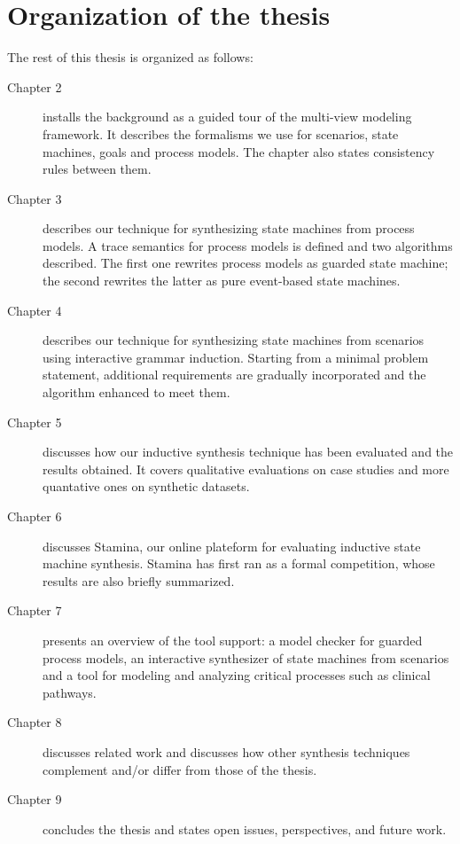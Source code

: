 \section{Organization of the thesis\label{section:intro-organization}}

The rest of this thesis is organized as follows:

\begin{description}

\item[Chapter 2] installs the background as a guided tour of the multi-view modeling framework. It describes the formalisms we use for scenarios, state machines, goals and process models. The chapter also states consistency rules between them.

\item[Chapter 3] describes our technique for synthesizing state machines from process models. A trace semantics for process models is defined and two algorithms described. The first one rewrites process models as guarded state machine; the second rewrites the latter as pure event-based state machines.

\item[Chapter 4] describes our technique for synthesizing state machines from scenarios using interactive grammar induction. Starting from a minimal problem statement, additional requirements are gradually incorporated and the algorithm enhanced to meet them.

\item[Chapter 5] discusses how our inductive synthesis technique has been evaluated and the results obtained. It covers qualitative evaluations on case studies and more quantative ones on synthetic datasets.

\item[Chapter 6] discusses Stamina, our online plateform for evaluating inductive state machine synthesis. Stamina has first ran as a formal competition, whose results are also briefly summarized.

\item[Chapter 7] presents an overview of the tool support: a model checker for guarded process models, an interactive synthesizer of state machines from scenarios and a tool for modeling and analyzing critical processes such as clinical pathways. 

\item[Chapter 8] discusses related work and discusses how other synthesis techniques complement and/or differ from those of the thesis.

\item[Chapter 9] concludes the thesis and states open issues, perspectives, and future work. 

\end{description}
